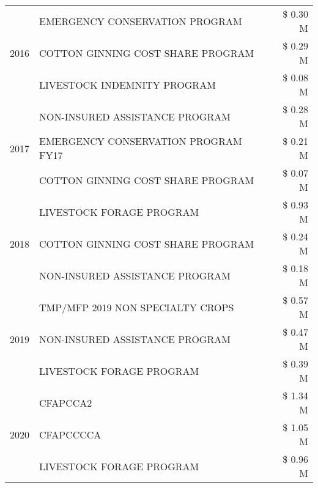 \begin{tabular}{llr}
\cline{1-3}
\multirow[t]{3}{*}{2016} & EMERGENCY CONSERVATION PROGRAM & \$ 0.30 M \\
 & COTTON GINNING COST SHARE PROGRAM & \$ 0.29 M \\
 & LIVESTOCK INDEMNITY PROGRAM & \$ 0.08 M \\
\cline{1-3}
\multirow[t]{3}{*}{2017} & NON-INSURED ASSISTANCE PROGRAM & \$ 0.28 M \\
 & EMERGENCY CONSERVATION PROGRAM FY17 & \$ 0.21 M \\
 & COTTON GINNING COST SHARE PROGRAM & \$ 0.07 M \\
\cline{1-3}
\multirow[t]{3}{*}{2018} & LIVESTOCK FORAGE PROGRAM & \$ 0.93 M \\
 & COTTON GINNING COST SHARE PROGRAM & \$ 0.24 M \\
 & NON-INSURED ASSISTANCE PROGRAM & \$ 0.18 M \\
\cline{1-3}
\multirow[t]{3}{*}{2019} & TMP/MFP 2019 NON SPECIALTY CROPS & \$ 0.57 M \\
 & NON-INSURED ASSISTANCE PROGRAM & \$ 0.47 M \\
 & LIVESTOCK FORAGE PROGRAM & \$ 0.39 M \\
\cline{1-3}
\multirow[t]{3}{*}{2020} & CFAPCCA2 & \$ 1.34 M \\
 & CFAPCCCCA & \$ 1.05 M \\
 & LIVESTOCK FORAGE PROGRAM & \$ 0.96 M \\
\cline{1-3}
\bottomrule
\end{tabular}
